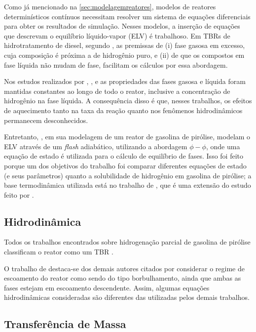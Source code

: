 Como já mencionado na \autoref{sec:modelagemreatores}, modelos de reatores
determinísticos contínuos necessitam resolver um sistema de equações
diferenciais para obter os resultados de simulação. Nesses modelos, a inserção
de equações que descrevam o equilíbrio líquido-vapor (ELV) é trabalhoso. Em
TBRs de hidrotratamento de diesel, segundo , as
premissas de (i) fase gasosa em excesso, cuja composição é próxima a de
hidrogênio puro, e (ii) de que os compostos em fase líquida não mudam de fase,
facilitam os cálculos por essa abordagem.

Nos estudos realizados por ,
,  e
 as propriedades das fases gasosa e líquida foram
mantidas constantes ao longo de todo o reator, inclusive a concentração de
hidrogênio na fase líquida. A consequência disso é que, nesses trabalhos, os
efeitos de aquecimento tanto na taxa da reação quanto nos fenômenos
hidrodinâmicos permanecem desconhecidos.

Entretanto, , em sua modelagem de um reator de
gasolina de pirólise, modelam o ELV através de um \emph{flash} adiabático,
utilizando a abordagem $\phi-\phi$, onde uma equação de estado é utilizada para
o cálculo de equilíbrio de fases. Isso foi feito porque um dos objetivos do
trabalho foi comparar diferentes equações de estado (e seus parâmetros) quanto a
solubilidade de hidrogênio em gasolina de pirólise; a base termodinâmica
utilizada está no trabalho de , que é uma extensão do
estudo feito por .

\subsection{Hidrodinâmica} \label{sec:hidrodinamica}
Todos os trabalhos encontrados sobre hidrogenação parcial de gasolina de
pirólise classificam o reator como um TBR \cite{Arpornwichanop2002,
Authayanun2008, Mostoufi2005a, Arpornwichanop2008, Rojas2014a}. 

O trabalho de  destaca-se dos demais autores
citados por considerar o regime de escoamento do reator como sendo do tipo
borbulhamento, ainda que ambas as fases estejam em escoamento descendente.
Assim, algumas equações hidrodinâmicas consideradas são diferentes das
utilizadas pelos demais trabalhos.

\subsection{Transferência de Massa} \label{sec:transferenciamassa}

